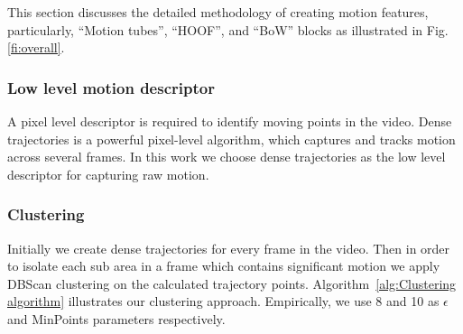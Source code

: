 This section discusses the detailed methodology of creating motion features, particularly, ``Motion tubes'', ``HOOF'', and ``BoW'' blocks as illustrated in Fig. \ref{fi:overall}.

\subsubsection{Low level motion descriptor}
A pixel level descriptor is required to identify moving points in the video. Dense trajectories \cite{wang2011action} is a powerful
pixel-level algorithm, which captures and tracks motion across several frames. In this work
we choose dense trajectories as the low level descriptor for capturing raw motion.

\subsubsection{Clustering}

Initially we create dense trajectories for every frame in the video.
Then in order to isolate each sub area in a frame which contains significant motion we apply DBScan clustering on the calculated trajectory points.
Algorithm~\ref{alg:Clustering algorithm}  illustrates our clustering approach. Empirically, we use 8 and 10 as $\epsilon$ and MinPoints parameters respectively.



